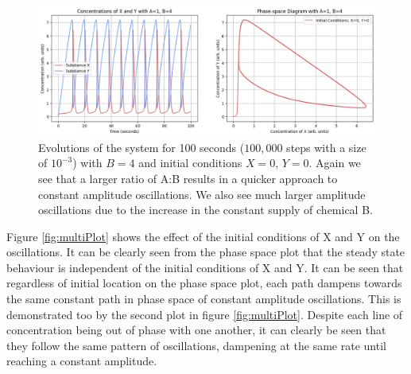 \documentclass[reprint, amsmath, amssymb, aps]{revtex4-2}
\begin{document}
\begin{figure}
\includegraphics[width=1.65\columnwidth]{oneToFour.png}
\caption{\label{fig:oneToFour}Evolutions of the system for 100 seconds ($100,000$ steps with a size of $10^{-3}$) with $B=4$ and initial conditions $X=0$, $Y=0$. Again we see that a larger ratio of A:B results in a quicker approach to constant amplitude oscillations. We also see much larger amplitude oscillations due to the increase in the constant supply of chemical B.}
\end{figure}

Figure \ref{fig:multiPlot} shows the effect of the initial conditions of X and Y on the oscillations. It can be clearly seen from the phase space plot that the steady state behaviour is independent of the initial conditions of X and Y. It can be seen that regardless of initial location on the phase space plot, each path dampens towards the same constant path in phase space of constant amplitude oscillations. This is demonstrated too by the second plot in figure \ref{fig:multiPlot}. Despite each line of concentration being out of phase with one another, it can clearly be seen that they follow the same pattern of oscillations, dampening at the same rate until reaching a constant amplitude.
\end{document}
